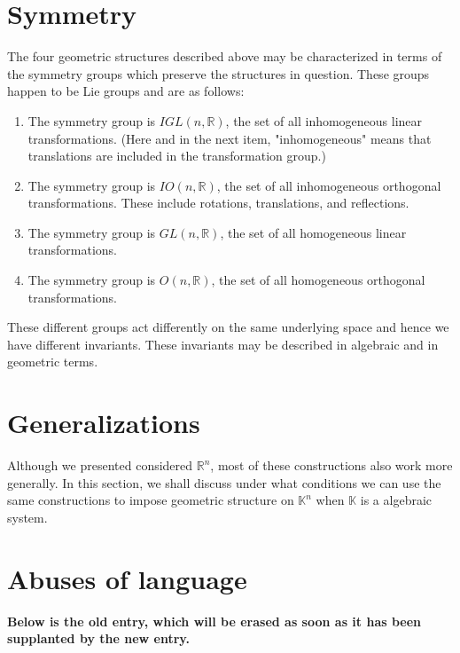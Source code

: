 \documentclass{article}
\begin{document}
\section{Symmetry}

The four geometric structures described above may be characterized in
terms of the symmetry groups which preserve the structures in question.
These groups happen to be Lie groups and are as follows:
\begin{enumerate}
\item The symmetry group is $IGL(n,\mathbb{R})$, the set of all
inhomogeneous linear transformations.  (Here and in the next item,
"inhomogeneous" means that translations are included in the
transformation group.)
\item The symmetry group is $IO(n,\mathbb{R})$, the set of all
inhomogeneous orthogonal transformations.  These include rotations,
translations, and reflections.
\item The symmetry group is $GL(n,\mathbb{R})$, the set of all
homogeneous linear transformations.
\item The symmetry group is $O(n,\mathbb{R})$, the set of all
homogeneous orthogonal transformations. 
\end{enumerate}

These different groups act differently on the same underlying space and hence we have different invariants.  These invariants may be described in algebraic and in geometric terms.


\section{Generalizations}

Although we presented considered $\mathbb{R}^n$, most of these constructions also work more generally.  In this section, we shall discuss under what conditions we can use the same constructions to impose geometric structure on $\mathbb{K}^n$ when $\mathbb{K}$ is a algebraic system.

\section{Abuses of language}

{\bf Below is the old entry, which will be erased as soon as it has been supplanted by the new entry.}
\end{document}
